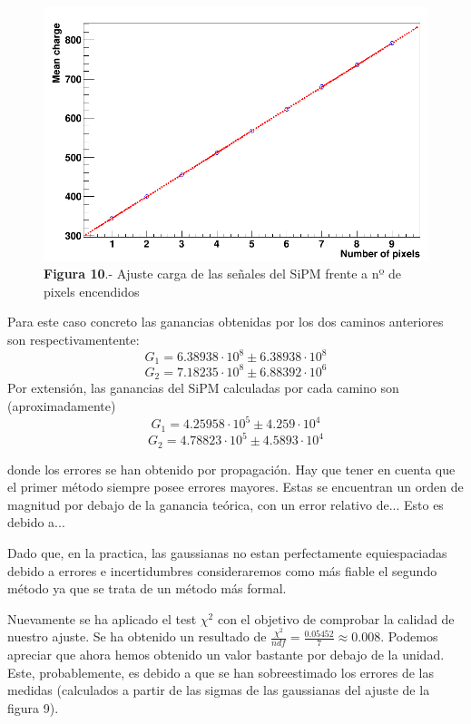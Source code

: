 \begin{enumerate}
\begin{enumerate}
	\begin{figure}[hbtp]
		\centering
		\includegraphics[scale=0.4]{FitPosicionPixels.png}
		\caption{\textbf{Figura 10}.- Ajuste carga de las señales del SiPM frente a nº de pixels encendidos}
		\end{figure}
			
	
	\end{enumerate}
	
Para este caso concreto las ganancias obtenidas por los dos caminos anteriores son respectivamentente:
\begin{equation}
G_1= 6.38938 \cdot 10^8 \pm  6.38938 \cdot 10^8
\label{gananciatotalmetodo1} 
\end{equation}
\begin{equation}
G_2=7.18235 \cdot 10^8 \pm 6.88392 \cdot 10^6
\label{gananciatotalmetodo2}
\end{equation}
Por extensión, las ganancias del SiPM calculadas por cada camino son (aproximadamente) 
\begin{equation}
G_1= 4.25958 \cdot 10^5 \pm 4.259 \cdot 10^4
\label{gananciaSiPMmetodo1}
\end{equation}
\begin{equation}
G_2= 4.78823 \cdot 10^5 \pm 4.5893 \cdot 10^4
\label{gananciaSiPMmetodo2}
\end{equation}

donde los errores se han obtenido por propagación. Hay que tener en cuenta que el primer método siempre posee errores mayores. Estas se encuentran un orden de magnitud por debajo de la ganancia teórica, con un error relativo de... Esto es debido a...

Dado que, en la practica, las gaussianas no estan perfectamente equiespaciadas debido a errores e incertidumbres consideraremos como más fiable el segundo método ya que se trata de un método más formal. 

Nuevamente se ha aplicado el test $\chi^2$ con el objetivo de comprobar la calidad de nuestro ajuste. Se ha obtenido un resultado de $\frac{\chi^2}{ndf}=\frac{0.05452}{7}\approx 0.008$. Podemos apreciar que ahora hemos obtenido un valor bastante por debajo de la unidad. Este, probablemente, es debido a que se han sobreestimado los errores de las medidas (calculados a partir de las sigmas de las gaussianas del ajuste de la figura 9).

\end{enumerate}